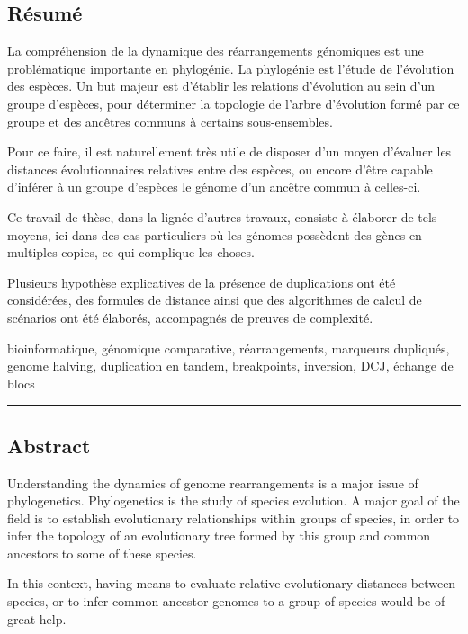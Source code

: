 \documentclass[11pt,final,twoside,nofrench]{thlifl}
\begin{document}
\clearpage

\pagestyle{empty}


\subsection*{Résumé}

La compréhension de la dynamique des réarrangements génomiques est une problématique importante en phylogénie.
La phylogénie est l'étude de l'évolution des espèces. Un but majeur est d'établir les relations d'évolution au sein d'un groupe d'espèces, pour déterminer la topologie de l'arbre d'évolution formé par ce groupe et des ancêtres communs à certains sous-ensembles.

Pour ce faire, il est naturellement très utile de disposer d'un moyen d'évaluer les distances évolutionnaires relatives entre des espèces, ou encore d'être capable d'inférer à un groupe d'espèces le génome d'un ancêtre commun à celles-ci.

Ce travail de thèse, dans la lignée d'autres travaux, consiste à élaborer de tels moyens, ici dans des cas particuliers où les génomes possèdent des gènes en multiples copies, ce qui complique les choses.

Plusieurs hypothèse explicatives de la présence de duplications ont été considérées, des formules de distance ainsi que des algorithmes de calcul de scénarios ont été élaborés, accompagnés de preuves de complexité.

\medskip
{} bioinformatique, génomique comparative, réarrangements, marqueurs dupliqués, genome halving, duplication en tandem, breakpoints, inversion, DCJ, échange de blocs

\vfill
\hrule
\vfill

\subsection*{Abstract}

Understanding the dynamics of genome rearrangements is a major issue of phylogenetics.
Phylogenetics is the study of species evolution. A major goal of the field is to establish evolutionary relationships within groups of species, in order to infer the topology of an evolutionary tree formed by this group and common ancestors to some of these species.

In this context, having means to evaluate relative evolutionary distances between species, or to infer common ancestor genomes to a group of species would be of great help.
\end{document}

